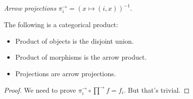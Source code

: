 \begin{defn}
\emph{Arrow projections}
$\pi^{\rightarrow}_i = (x\mapsto(i,x))^{-1}$.
\end{defn}

\begin{thm}
The following is a categorical product:
\begin{itemize}
\item Product of objects is the disjoint union.
\item Product of morphisms is the arrow product.
\item Projections are arrow projections.
\end{itemize}
\end{thm}

\begin{proof}
We need to prove $\pi^{\rightarrow}_i\circ\prod^{\rightarrow}f=f_i$. But that's trivial.
\end{proof}